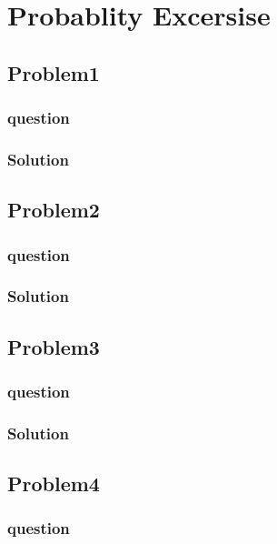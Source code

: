 \documentclass[journal,12pt,twocolumn]{IEEEtran}
\begin{document}
\section{Probablity Excersise}
\subsection{Problem1}
\subsubsection{question}

\subsubsection{Solution}


\subsection{Problem2}
\subsubsection{question}

\subsubsection{Solution}



\subsection{Problem3}
\subsubsection{question}

\subsubsection{Solution}


\subsection{Problem4}
\subsubsection{question}

\end{document}
